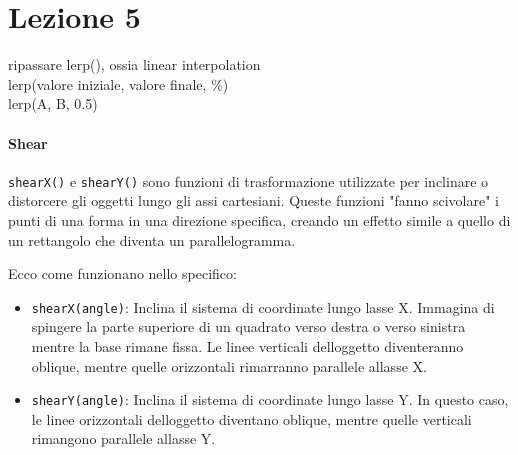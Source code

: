 \documentclass[
]{article}
\author{}
\date{}
\begin{document}
\section{Lezione 5}\label{lezione-5}

ripassare lerp(), ossia linear interpolation\\
lerp(valore iniziale, valore finale, \%)\\
lerp(A, B, 0.5)

\paragraph{Shear}\label{shear}

\texttt{shearX()} e \texttt{shearY()} sono funzioni di trasformazione
utilizzate per inclinare o distorcere gli oggetti lungo gli assi
cartesiani. Queste funzioni "fanno scivolare" i punti di una forma in
una direzione specifica, creando un effetto simile a quello di un
rettangolo che diventa un parallelogramma.

Ecco come funzionano nello specifico:

\begin{itemize}
\item
  \texttt{shearX(angle)}: Inclina il sistema di coordinate lungo
  l\textquotesingle asse X. Immagina di spingere la parte superiore di
  un quadrato verso destra o verso sinistra mentre la base rimane fissa.
  Le linee verticali dell\textquotesingle oggetto diventeranno oblique,
  mentre quelle orizzontali rimarranno parallele
  all\textquotesingle asse X.
\item
  \texttt{shearY(angle)}: Inclina il sistema di coordinate lungo
  l\textquotesingle asse Y. In questo caso, le linee orizzontali
  dell\textquotesingle oggetto diventano oblique, mentre quelle
  verticali rimangono parallele all\textquotesingle asse Y.
\end{itemize}
\end{document}
